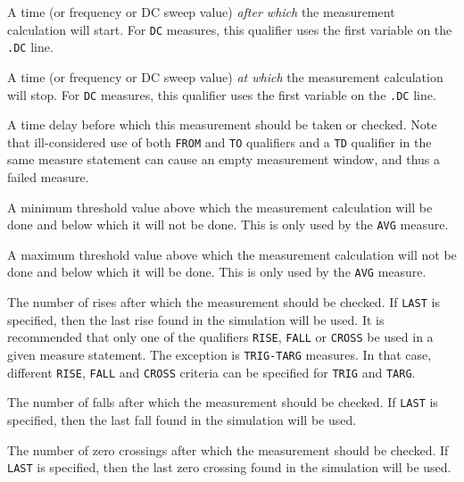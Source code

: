 \begin{Command}
\begin{Arguments}

A time (or frequency or DC sweep value) {\em after which} the
measurement calculation will start.  For {\tt DC} measures, this
qualifier uses the first variable on the {\tt .DC} line.


A time (or frequency or DC sweep value) {\em at which} the measurement
calculation will stop.  For {\tt DC} measures, this qualifier uses the
first variable on the {\tt .DC} line.


A time delay before which this measurement should be taken or checked.
Note that ill-considered use of both {\tt FROM} and {\tt TO}
qualifiers and a {\tt TD} qualifier in the same measure statement can
cause an empty measurement window, and thus a failed measure.


A minimum threshold value above which the measurement calculation will
be done and below which it will not be done.  This is only used by the
{\tt AVG} measure.


A maximum threshold value above which the measurement calculation will
not be done and below which it will be done.  This is only used by the
{\tt AVG} measure.


The number of rises after which the measurement should be checked.  If
\texttt{LAST} is specified, then the last rise found in the simulation
will be used.  It is recommended that only one of the qualifiers {\tt RISE}, 
{\tt FALL} or {\tt CROSS} be used in a given measure statement.  The exception 
is {\tt TRIG-TARG} measures.  In that case, different {\tt RISE}, {\tt FALL}
and {\tt CROSS} criteria can be specified for {\tt TRIG} and {\tt TARG}.


The number of falls after which the measurement should be checked.  If
\texttt{LAST} is specified, then the last fall found in the simulation
will be used.


The number of zero crossings after which the measurement should be
checked.  If \texttt{LAST} is specified, then the last zero crossing
found in the simulation will be used.



\end{Arguments}
\end{Command}
